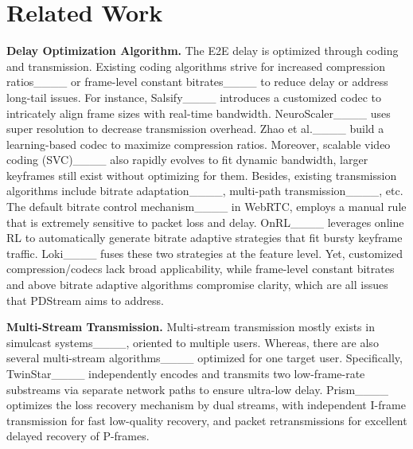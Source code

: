 \section{Related Work}
\label{sec:related}

\textbf{Delay Optimization Algorithm.} The E2E delay is optimized through coding and transmission. Existing coding algorithms strive for increased compression ratios____ or frame-level constant bitrates____ to reduce delay or address long-tail issues. For instance, Salsify____ introduces a customized codec to intricately align frame sizes with real-time bandwidth. NeuroScaler____ uses super resolution to decrease transmission overhead. Zhao et al.____ build a learning-based codec to maximize compression ratios. Moreover, scalable video coding (SVC)____ also rapidly evolves to fit dynamic bandwidth, larger keyframes still exist without optimizing for them.
Besides, existing transmission algorithms include bitrate adaptation____, multi-path transmission____, etc. The default bitrate control mechanism____ in WebRTC, employs a manual rule that is extremely sensitive to packet loss and delay. OnRL____ leverages online RL to automatically generate bitrate adaptive strategies that fit bursty keyframe traffic. Loki____ fuses these two strategies at the feature level. %
Yet, customized compression/codecs lack broad applicability, while frame-level constant bitrates and above bitrate adaptive algorithms compromise clarity, which are all issues that PDStream aims to address.

\textbf{Multi-Stream Transmission.} Multi-stream transmission mostly exists in simulcast systems____, oriented to multiple users. Whereas, there are also several multi-stream algorithms____ optimized for one target user. Specifically, TwinStar____ independently encodes and transmits two low-frame-rate substreams via separate network paths to ensure ultra-low delay. Prism____ optimizes the loss recovery mechanism by dual streams, with independent I-frame transmission for fast low-quality recovery, and packet retransmissions for excellent delayed recovery of P-frames.

